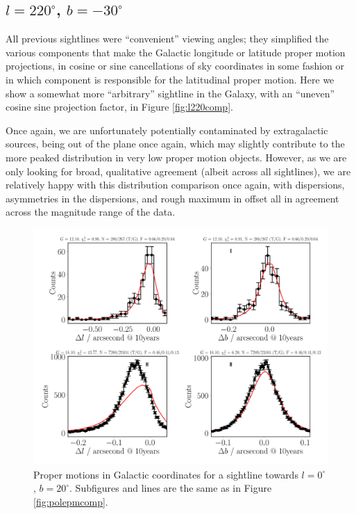 \documentclass[fleqn,usenatbib]{mnras}
\begin{document}
\subsection{$l = 220^\circ$, $b = -30^\circ$}
All previous sightlines were ``convenient'' viewing angles; they simplified the various components that make the Galactic longitude or latitude proper motion projections, in cosine or sine cancellations of sky coordinates in some fashion or in which component is responsible for the latitudinal proper motion. Here we show a somewhat more ``arbitrary'' sightline in the Galaxy, with an ``uneven'' cosine sine projection factor, in Figure \ref{fig:l220comp}.

Once again, we are unfortunately potentially contaminated by extragalactic sources, being out of the plane once again, which may slightly contribute to the more peaked distribution in very low proper motion objects. However, as we are only looking for broad, qualitative agreement (albeit across all sightlines), we are relatively happy with this distribution comparison once again, with dispersions, asymmetries in the dispersions, and rough maximum in offset all in agreement across the magnitude range of the data.

\begin{figure}
    \centering
    \includegraphics[width=\columnwidth]{Plots/plots_pm_gaia_0_20.pdf}
    \caption{Proper motions in Galactic coordinates for a sightline towards $l = 0^\circ$, $b = 20^\circ$. Subfigures and lines are the same as in Figure \ref{fig:polepmcomp}.}
    \label{fig:l0comp}
\end{figure}
\end{document}
